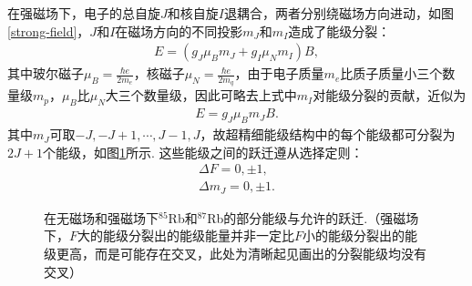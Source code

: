 \documentclass[UTF8,a4paper,10pt]{article}
\begin{document}
在强磁场下，电子的总自旋$J$和核自旋$I$退耦合，两者分别绕磁场方向进动，如图\ref{strong-field}，$J$和$I$在磁场方向的不同投影$m_J$和$m_I$造成了能级分裂：
\begin{align}
    E=(g_J\mu_Bm_J+g_I\mu_Nm_I)B,
\end{align}
其中玻尔磁子$\mu_B=\frac{\hbar e}{2m_e}$，核磁子$\mu_N=\frac{\hbar e}{2m_q}$，由于电子质量$m_e$比质子质量小三个数量级$m_p$，$\mu_B$比$\mu_N$大三个数量级，因此可略去上式中$m_I$对能级分裂的贡献，近似为
\begin{align}
    E=g_J\mu_Bm_JB.
\end{align}
其中$m_J$可取$-J,-J+1,\cdots,J-1,J$，故超精细能级结构中的每个能级都可分裂为$2J+1$个能级，如图\ref{energy-state-strong-field}所示. 这些能级之间的跃迁遵从选择定则：
\begin{gather}
    \Delta F=0,\pm 1,\\
    \Delta m_J=0,\pm 1.
\end{gather}

\begin{figure}[ht]
    \centering
    \caption{在无磁场和强磁场下$^{85}$Rb和$^{87}$Rb的部分能级与允许的跃迁.（强磁场下，$F$大的能级分裂出的能级能量并非一定比$F$小的能级分裂出的能级更高，而是可能存在交叉，此处为清晰起见画出的分裂能级均没有交叉）}
    \label{energy-state-strong-field}
\end{figure}
\end{document}
